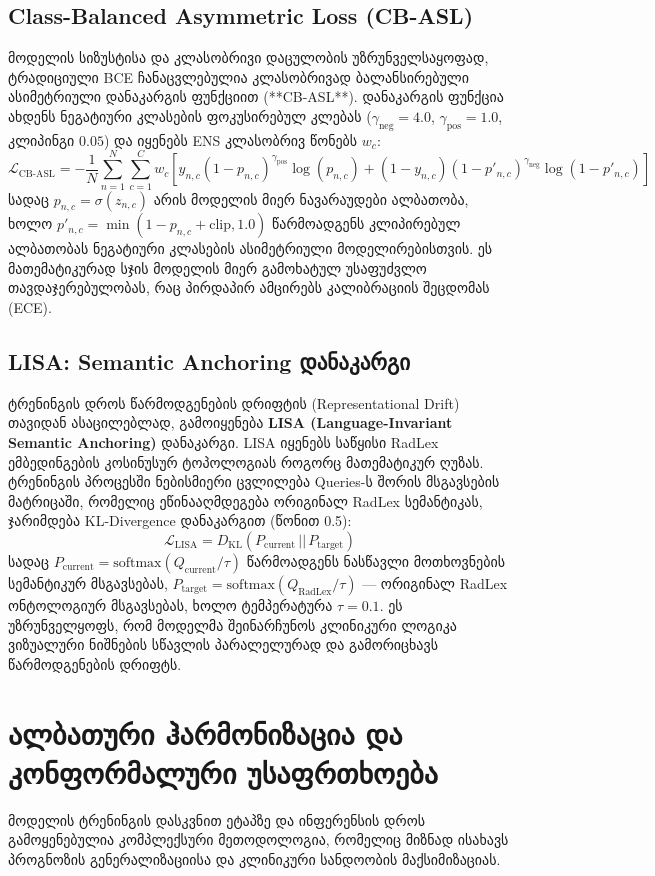 \documentclass[12pt,a4paper,oneside]{report}
\begin{document}
\subsection{Class-Balanced Asymmetric Loss (CB-ASL)}
მოდელის სიზუსტისა და კლასობრივი დაცულობის უზრუნველსაყოფად, ტრადიციული BCE ჩანაცვლებულია კლასობრივად ბალანსირებული ასიმეტრიული დანაკარგის ფუნქციით (**CB-ASL**). დანაკარგის ფუნქცია ახდენს ნეგატიური კლასების ფოკუსირებულ კლებას ($\gamma_{\text{neg}} = 4.0$, $\gamma_{\text{pos}} = 1.0$, კლიპინგი $0.05$) და იყენებს ENS კლასობრივ წონებს $w_c$:
\begin{equation}
\mathcal{L}_{\text{CB-ASL}} = - \frac{1}{N} \sum_{n=1}^N \sum_{c=1}^C w_c \left[ y_{n,c} (1 - p_{n,c})^{\gamma_{\text{pos}}} \log(p_{n,c}) + (1 - y_{n,c}) (1 - p'_{n,c})^{\gamma_{\text{neg}}} \log(1 - p'_{n,c}) \right]
\end{equation}
სადაც $p_{n,c} = \sigma(z_{n,c})$ არის მოდელის მიერ ნავარაუდები ალბათობა, ხოლო $p'_{n,c} = \min(1 - p_{n,c} + \text{clip}, 1.0)$ წარმოადგენს კლიპირებულ ალბათობას ნეგატიური კლასების ასიმეტრიული მოდელირებისთვის. ეს მათემატიკურად სჯის მოდელის მიერ გამოხატულ უსაფუძვლო თავდაჯერებულობას, რაც პირდაპირ ამცირებს კალიბრაციის შეცდომას (ECE).

\subsection{LISA: Semantic Anchoring დანაკარგი}
ტრენინგის დროს წარმოდგენების დრიფტის (Representational Drift) თავიდან ასაცილებლად, გამოიყენება \textbf{LISA (Language-Invariant Semantic Anchoring)} დანაკარგი. LISA იყენებს საწყისი RadLex ემბედინგების კოსინუსურ ტოპოლოგიას როგორც მათემატიკურ ღუზას. ტრენინგის პროცესში ნებისმიერი ცვლილება Queries-ს შორის მსგავსების მატრიცაში, რომელიც ეწინააღმდეგება ორიგინალ RadLex სემანტიკას, ჯარიმდება KL-Divergence დანაკარგით (წონით 0.5):
\begin{equation}
\mathcal{L}_{\text{LISA}} = D_{\text{KL}}(P_{\text{current}} \,||\, P_{\text{target}})
\end{equation}
სადაც $P_{\text{current}} = \text{softmax}(Q_{\text{current}} / \tau)$ წარმოადგენს ნასწავლი მოთხოვნების სემანტიკურ მსგავსებას, $P_{\text{target}} = \text{softmax}(Q_{\text{RadLex}} / \tau)$ — ორიგინალ RadLex ონტოლოგიურ მსგავსებას, ხოლო ტემპერატურა $\tau = 0.1$. ეს უზრუნველყოფს, რომ მოდელმა შეინარჩუნოს კლინიკური ლოგიკა ვიზუალური ნიშნების სწავლის პარალელურად და გამორიცხავს წარმოდგენების დრიფტს.

\section{ალბათური ჰარმონიზაცია და კონფორმალური უსაფრთხოება}
მოდელის ტრენინგის დასკვნით ეტაპზე და ინფერენსის დროს გამოყენებულია კომპლექსური მეთოდოლოგია, რომელიც მიზნად ისახავს პროგნოზის გენერალიზაციისა და კლინიკური სანდოობის მაქსიმიზაციას.
\end{document}
